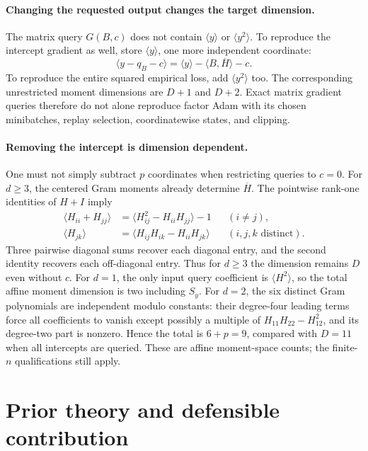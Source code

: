 \documentclass[11pt]{article}
\begin{document}
\paragraph{Changing the requested output changes the target dimension.}
The matrix query $G(B,c)$ does not contain $\langle y\rangle$ or
$\langle y^2\rangle$. To reproduce the intercept gradient as well,
store $\langle y\rangle$, one more independent coordinate:
\[
 \langle y-q_B-c\rangle
 =\langle y\rangle-\langle B,\overline H\rangle-c.
\]
To reproduce the entire squared empirical loss, add
$\langle y^2\rangle$ too. The corresponding unrestricted moment
dimensions are $D+1$ and $D+2$. Exact matrix gradient queries
therefore do not alone reproduce factor Adam with its chosen
minibatches, replay selection, coordinatewise states, and clipping.

\paragraph{Removing the intercept is dimension dependent.}
One must not simply subtract $p$ coordinates when restricting queries
to $c=0$. For $d\ge3$, the centered Gram moments already determine
$\overline H$. The pointwise rank-one identities of $H+I$ imply
\begin{align*}
 \langle H_{ii}+H_{jj}\rangle
    &=\langle H_{ij}^2-H_{ii}H_{jj}\rangle-1
            &&(i\ne j),\\
 \langle H_{jk}\rangle
    &=\langle H_{ij}H_{ik}-H_{ii}H_{jk}\rangle
            &&(i,j,k\text{ distinct}).
\end{align*}
Three pairwise diagonal sums recover each diagonal entry, and the
second identity recovers each off-diagonal entry. Thus for $d\ge3$
the dimension remains $D$ even without $c$. For $d=1$, the only
input query coefficient is $\langle H^2\rangle$, so the total affine
moment dimension is two including $S_y$. For $d=2$, the six distinct
Gram polynomials are independent modulo constants: their degree-four
leading terms force all coefficients to vanish except possibly a
multiple of $H_{11}H_{22}-H_{12}^2$, and its degree-two part is
nonzero. Hence the total is $6+p=9$, compared with $D=11$ when all
intercepts are queried. These are affine moment-space counts; the
finite-$n$ qualifications still apply.

\section{Prior theory and defensible contribution}
\end{document}
